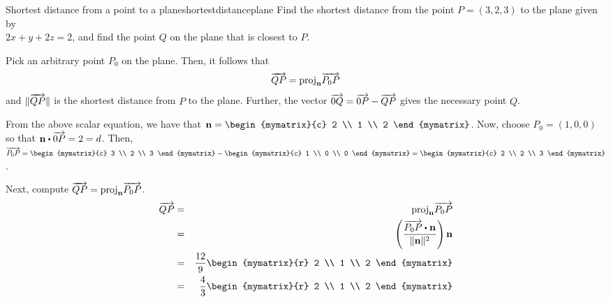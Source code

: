 \begin{example}{Shortest distance from a point to a plane}{shortestdistanceplane}
Find the shortest distance from the point $P = (3,2,3)$ to the plane given by \\ $ 2x + y + 2z = 2$, and find the point $Q$ on the plane that is closest to $P$. 
\end{example}

\begin{solution}
Pick an arbitrary point $P_0$ on the plane. Then, it follows that
\[
\overrightarrow{QP} = \mbox{proj}_{{\bf n}}\overrightarrow{P_0P}
\]
and $\| \overrightarrow{QP} \|$ is the shortest distance from $P$ to the plane. Further, the vector $\overrightarrow{0Q} = \overrightarrow{0P} - \overrightarrow{QP}$ gives the necessary point $Q$. 

From the above scalar equation, we have that $\vect{n} = 
\begin{mymatrix}{c}
2 \\
1 \\
2 
\end{mymatrix}$. Now, choose $P_0 = (1, 0, 0)$ so that $\vect{n} \dotprod \longvect{0P} = 2 = d$. 
Then, $\longvect{P_0P} = \begin{mymatrix}{c}
3 \\
2 \\
3
\end{mymatrix}
- 
\begin{mymatrix}{c}
1 \\
0 \\
0
\end{mymatrix}
=
\begin{mymatrix}{c}
2 \\
2 \\
3
\end{mymatrix}$. 

Next, compute $\overrightarrow{QP} = \mbox{proj}_{{\bf n}}\overrightarrow{P_0P}$. 
\begin{eqnarray*}
\longvect{QP} &=& \func{proj}_{\vect{n}}\longvect{P_0P} \\
&=& \tup{\frac{ \longvect{P_0P} \dotprod \vect{n}}{\vectlength \vect{n} \vectlength ^2}}\vect{n} \\
&=& \frac{12}{9} \begin{mymatrix}{r}
2 \\
1 \\
2
\end{mymatrix} \\
&=& \frac{4}{3} \begin{mymatrix}{r}
2 \\
1 \\
2
\end{mymatrix} 
\end{eqnarray*}


\end{solution}
